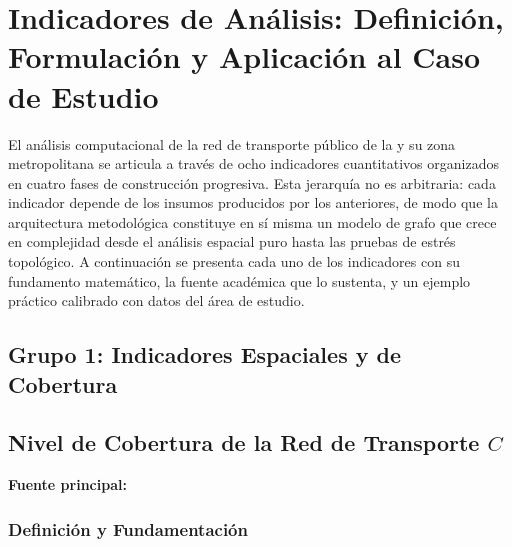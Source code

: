 

\section{Indicadores de Análisis: Definición, Formulación y Aplicación al
         Caso de Estudio}
\label{sec:indicadores-formulas}

El análisis computacional de la red de transporte público de la \cdmx{} y su
zona
metropolitana se articula a través de ocho indicadores cuantitativos organizados
en
cuatro fases de construcción progresiva. Esta jerarquía no es arbitraria: cada
indicador depende de los insumos producidos por los anteriores, de modo que la
arquitectura metodológica constituye en sí misma un modelo de grafo que crece en
complejidad desde el análisis espacial puro hasta las pruebas de estrés
topológico.
A continuación se presenta cada uno de los indicadores con su fundamento
matemático, la fuente académica que lo sustenta, y un ejemplo práctico calibrado
con datos del área de estudio.


\subsection*{Grupo 1: Indicadores Espaciales y de Cobertura}
 
\subsection{Nivel de Cobertura de la Red de Transporte \texorpdfstring{$C$}{C}}
\label{subsec:indicador-cobertura}
 
\textbf{Fuente principal:} \citet{fortin2016innovative}
 
\subsubsection{Definición y Fundamentación}
 
